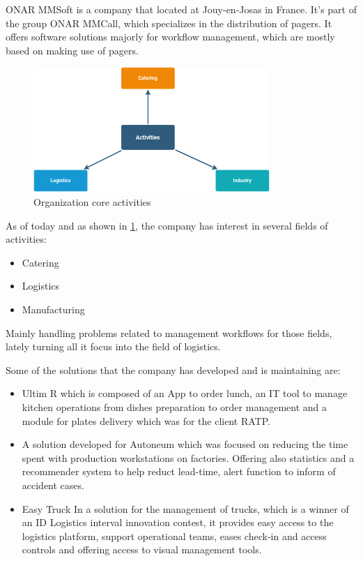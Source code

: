 ONAR MMSoft is a company that located at Jouy-en-Josas in France.
It's part of the group ONAR MMCall, which specializes in the distribution
of pagers.
It offers software solutions majorly for workflow management, which
are mostly based on making use of pagers.

\begin{figure}[!htpb]
    \centering
    \includegraphics[width=0.8\textwidth]{images/core_activities.png}
    \caption{\footnotesize{Organization core activities}}
    \label{fig:core_activities}
\end{figure}

As of today and as shown in \ref{fig:core_activities}, the company has
interest in several fields of activities:
\begin{itemize}
    \item Catering
    \item Logistics
    \item Manufacturing
\end{itemize}

Mainly handling problems related to management workflows for those fields,
lately turning all it focus into the field of logistics.

Some of the solutions that the company has developed and is maintaining are:
\begin{itemize}
    \item Ultim R which is composed of an App to order lunch, an IT tool to manage kitchen
        operations from dishes preparation to order management and a module for plates
        delivery which was for the client RATP.

    \item A solution developed for Autoneum which was focused on reducing the time
        spent with production workstations on factories. Offering also statistics
        and a recommender system to help reduct lead-time, alert function to 
        inform of accident cases.

    \item Easy Truck In a solution for the management of trucks, which is a winner of an
        ID Logistics interval innovation contest, it provides easy access to the logistics
        platform, support operational teams, eases check-in and access controls and
        offering access to visual management tools.
\end{itemize}

